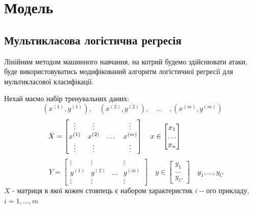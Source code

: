 \documentclass[a4paper,14pt]{extreport}
\begin{document}
	\chapter{Модель}
	
	\section{Мультикласова логістична регресія}
	\label{sec:lg}
	Лінійним методом машинного навчання, на котрий будемо здійснювати атаки, буде використовуватись модифікований алгоритм логістичної регресії для мультикласової класифікації. \par
	Нехай маємо набір тренувальних даних:
	\begin{equation*}
		(x^{(1)}, y^{(1)}), \quad (x^{(2)}, y^{(2)}), \quad ... \quad ,(x^{(m)}, y^{(m)})
	\end{equation*}
	\begin{equation*}
		\quad
		X =	
		\begin{bmatrix}
		\vdots  & \vdots  & & \vdots \\
		x^{(1)} & x^{(2)} &   \dots & x^{(m)}\\
		\vdots  & \vdots  & & \vdots
		\end{bmatrix}
		\quad
		x \in
		\begin{bmatrix}
		x_1   \\
		\dots \\
		x_n
		\end{bmatrix}
		\hspace{21 mm}
	\end{equation*}
	\begin{equation*}
		\quad
		Y =	
		\begin{bmatrix}
		\vdots  & \vdots  & & \vdots \\
		y^{(1)} & y^{(2)} &   \dots & y^{(m)}\\
		\vdots  & \vdots  & & \vdots
		\end{bmatrix}
		\quad
		y \in
		\begin{bmatrix}
		y_1   \\
		\dots \\
		y_C
		\end{bmatrix}
		\quad
		y_1, ..., y_C
	\end{equation*}
	\newline
	$X$ - матриця в якої кожен стовпець є набором характеристик $i-$ого прикладу, \newline $i=1,\dots,m$ 
\end{document}

